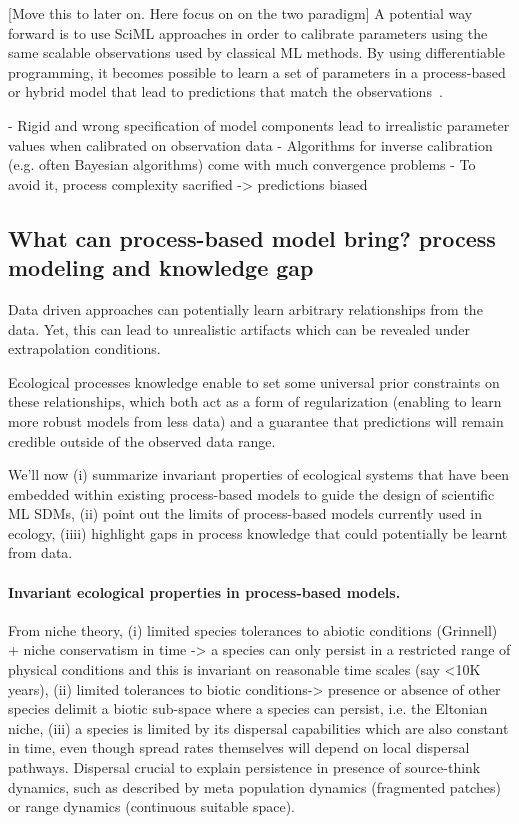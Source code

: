 
[Move this to later on. Here focus on on the two paradigm] 
A potential way forward is to use SciML approaches in order to calibrate parameters using the same scalable observations used by classical ML methods.
By using differentiable programming, it becomes possible to learn a set of parameters in a process-based or hybrid model that lead to predictions that match the observations~\cite{karniadakis2021physics,shen2023differentiable}.

- Rigid and wrong specification of model components lead to irrealistic parameter values when calibrated on observation data 
- Algorithms for inverse calibration (e.g. often Bayesian algorithms) come with much convergence problems 
- To avoid it, process complexity sacrified -> predictions biased 

\subsection{What can process-based model bring? process modeling and knowledge gap} %
Data driven approaches can potentially learn arbitrary relationships from the data. Yet, this can lead to unrealistic artifacts which can be revealed under extrapolation conditions.

Ecological processes knowledge enable to set some universal prior constraints on these relationships, which both act as a form of regularization (enabling to learn more robust models from less data) and a guarantee that predictions will remain credible outside of the observed data range.

We'll now (i) summarize invariant properties of ecological systems that have been embedded within existing process-based models to guide the design of scientific ML SDMs, (ii) point out the limits of process-based models currently used in ecology, (iiii) highlight gaps in process knowledge that could potentially be learnt from data. 

\paragraph{Invariant ecological properties in process-based models.} 

From niche theory, (i) limited species tolerances to abiotic conditions (Grinnell) + niche conservatism in time -> a species can only persist in a restricted range of physical conditions and this is invariant on reasonable time scales (say <10K years), (ii) limited tolerances to biotic conditions-> presence or absence of other species delimit a biotic sub-space where a species can persist, i.e. the Eltonian niche, (iii) a species is limited by its dispersal capabilities which are also constant in time, even though spread rates themselves will depend on local dispersal pathways. Dispersal crucial to explain persistence in presence of source-think dynamics, such as described by meta population dynamics (fragmented patches) or range dynamics (continuous suitable space). 

